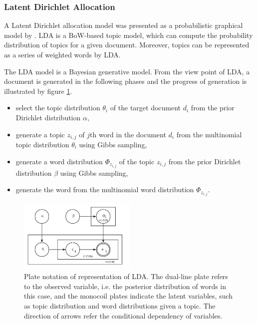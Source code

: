 \subsubsection{Latent Dirichlet Allocation}

A Latent Dirichlet allocation model was presented as a probabilistic graphical model by \cite{Blei:2003}. LDA is a BoW-based topic model, which can compute the probability distribution of topics for a given document. Moreover, topics can be represented as a series of weighted words by LDA. 

The LDA model is a Bayesian generative model. From the view point of LDA, a document is generated in the following phases and the progress of generation is illustrated by figure \ref{fig:lda}.

\begin{itemize}
    \item[1.] select the topic distribution $\theta_i$ of the target document $d_i$ from the prior Dirichlet distribution $\alpha$, 
    \item[2.] generate a topic $z_{i,j}$ of $j$th word in the document $d_i$ from the multinomial topic distribution $\theta_i$ using Gibbs sampling,
    \item[3.] generate a word distribution $\Phi_{z_{i,j}}$ of the topic $z_{i,j}$ from the prior Dirichlet distribution $\beta$ using Gibbs sampling, 
    \item[4.] generate the word from the multinomial word distribution $\Phi_{z_{i,j}}$. 
\end{itemize}



\begin{figure}[!htb]
    \centering
    \includegraphics[width=0.5\textwidth]{fig/lda.pdf}
    \caption{Plate notation of representation of LDA. The dual-line plate refers to the observed variable, i.e. the posterior distribution of words in this case, and the monocoil plates indicate the latent variables, such as topic distribution and word distributions given a topic. The direction of arrows refer the conditional dependency of variables. }
    \label{fig:lda}
\end{figure}

